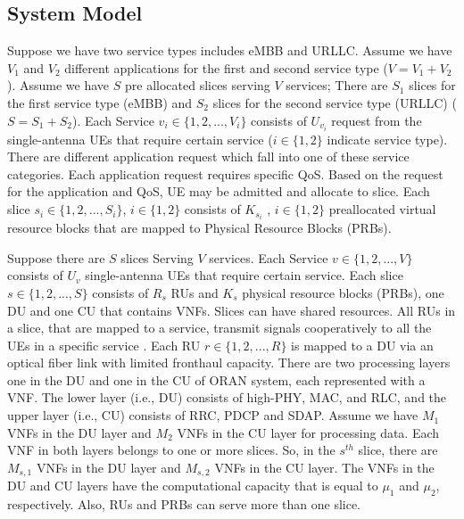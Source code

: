 \documentclass[conference]{IEEEtran}
\begin{document}
\subsection{System Model}
Suppose we have two service types includes eMBB and URLLC. Assume we have $V_1$ and $V_2$ different applications for the first and second service type ($V = V_1 + V_2$).
Assume we have $S$ pre allocated slices serving $V$ services; There are $S_1$ slices for the first service type (eMBB) and $S_2$ slices for the second service type (URLLC) ($S = S_1 + S_2$).
Each Service $v_i\in \{1,2,...,V_i \} $ consists of $U_{v_i}$ request from the 
single-antenna UEs that require certain service ($i \in \{1,2\}$ indicate service type).
There are different application request which fall into one of these service categories. Each application request requires specific QoS. Based on the request for the application and QoS, UE may be admitted and allocate to slice.
Each slice $s_i \in \{1,2,...,S_i \}$, $i \in \{1,2\}$ consists of $K_{s_i}$ , $i \in \{1,2\}$ preallocated virtual resource blocks that are mapped to Physical Resource Blocks (PRBs).





Suppose there are $S$ slices Serving $V$ services. Each Service $v\in \{1,2,...,V \} $ consists of $U_v$
single-antenna UEs that require certain service. Each slice $s \in \{1,2,...,S \}$ consists of $R_s$ RUs and $K_s$ physical resource blocks (PRBs), one DU and one CU that contains VNFs.
Slices can have shared resources. All RUs in a slice, that are mapped to a service, transmit signals cooperatively to all the UEs in a specific service \cite{motalleb2017optimal,mimoCran}. Each RU $r \in \{1,2,...,R \}$ is mapped to a DU via an optical fiber link with limited fronthaul capacity.
There are two processing layers one in the DU and one in the CU of ORAN system, each represented with a VNF. The lower layer (i.e., DU) consists of high-PHY, MAC, and RLC, and the upper layer (i.e., CU) consists of RRC, PDCP and SDAP. Assume we have $M_1$ VNFs in the DU layer and $M_2$ VNFs in the CU layer for processing data.
Each VNF in both layers belongs to one or more slices. So, in the $s^{th}$ slice, there are $M_{s,1}$ VNFs in the DU layer and $M_{s,2}$ VNFs in the CU layer. The VNFs in the DU and CU layers have the computational capacity that is  equal to $\mu_1$ and $\mu_2$, respectively.
Also, RUs and PRBs can serve more than one slice.
\end{document}
